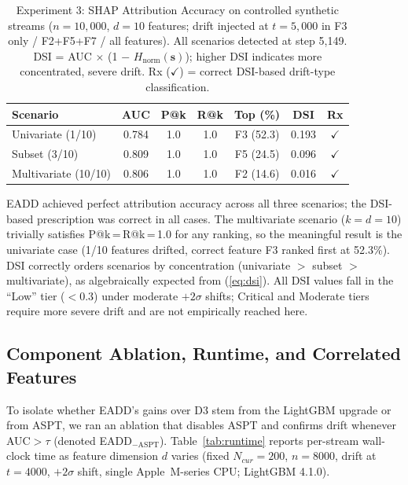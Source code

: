 \documentclass[conference,a4paper]{IEEEtran}
\begin{document}
\begin{table}[htbp]
    \caption{Experiment 3: SHAP Attribution Accuracy on controlled synthetic streams ($n{=}10{,}000$, $d{=}10$ features; drift injected at $t{=}5{,}000$ in F3 only / F2+F5+F7 / all features). All scenarios detected at step 5{,}149. DSI = AUC $\times$ (1 $-$ $H_{\text{norm}}(\mathbf{s})$); higher DSI indicates more concentrated, severe drift. Rx ($\checkmark$) = correct DSI-based drift-type classification.}
    \label{tab:exp3}
    \centering\footnotesize
    \setlength{\tabcolsep}{3pt}
    \begin{tabular*}{\columnwidth}{@{\extracolsep{\fill}}>{\raggedright\arraybackslash}p{}cccccc}
        \toprule
        \textbf{Scenario} & \textbf{AUC} & \textbf{P@k} & \textbf{R@k} & \textbf{Top (\%)} & \textbf{DSI} & \textbf{Rx} \\
        \midrule
        Univariate (1/10) & 0.784 & 1.0 & 1.0 & F3 (52.3) & 0.193 & $\checkmark$ \\
        Subset (3/10) & 0.809 & 1.0 & 1.0 & F5 (24.5) & 0.096 & $\checkmark$ \\
        Multivariate (10/10) & 0.806 & 1.0 & 1.0 & F2 (14.6) & 0.016 & $\checkmark$ \\
        \bottomrule
    \end{tabular*}
\end{table}

EADD achieved perfect attribution accuracy across all three scenarios; the DSI-based prescription was correct in all cases. The multivariate scenario ($k{=}d{=}10$) trivially satisfies P@k\,{=}\,R@k\,{=}\,1.0 for any ranking, so the meaningful result is the univariate case (1/10 features drifted, correct feature F3 ranked first at 52.3\%). DSI correctly orders scenarios by concentration (univariate $>$ subset $>$ multivariate), as algebraically expected from (\ref{eq:dsi}). All DSI values fall in the ``Low'' tier ($< 0.3$) under moderate $+2\sigma$ shifts; Critical and Moderate tiers require more severe drift and are not empirically reached here.

\subsection{Component Ablation, Runtime, and Correlated Features}

To isolate whether EADD's gains over D3 stem from the LightGBM upgrade or from ASPT, we ran an ablation that disables ASPT and confirms drift whenever AUC$> \tau$ (denoted EADD$_{-\mathrm{ASPT}}$). Table~\ref{tab:runtime} reports per-stream wall-clock time as feature dimension $d$ varies (fixed $N_{cur}{=}200$, $n{=}8000$, drift at $t{=}4000$, $+2\sigma$ shift, single Apple~M-series CPU; LightGBM 4.1.0).
\end{document}
